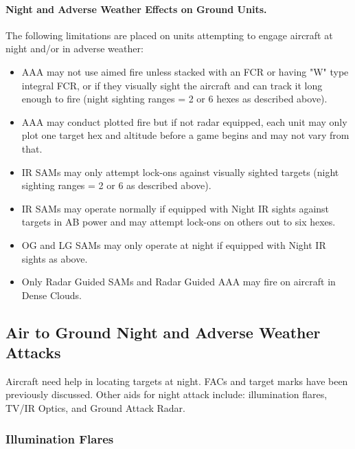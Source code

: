 \paragraph{Night and Adverse Weather Effects on Ground Units.} The following limitations are placed on units attempting to engage aircraft at night and/or in adverse weather:

\begin{itemize}

    \item AAA may not use aimed fire unless stacked with an FCR or having "W" type integral FCR, or if they visually sight the aircraft and can track it long enough to fire (night sighting ranges = 2 or 6 hexes as described above).

    \item AAA may conduct plotted fire but if not radar equipped, each unit may only plot one target hex and altitude before a game begins and may not vary from that.

    \item IR SAMs may only attempt lock-ons against visually sighted targets (night sighting ranges = 2 or 6 as described above).

    \item IR SAMs may operate normally if equipped with Night IR sights against targets in AB power and may attempt lock-ons on others out to six hexes.

    \item OG and LG SAMs may only operate at night if equipped with Night IR sights as above.

    \item Only Radar Guided SAMs and Radar Guided AAA may fire on aircraft in Dense Clouds.

\end{itemize}

\subsection{Air to Ground Night and Adverse Weather Attacks}

Aircraft need help in locating targets at night. FACs and target marks have been previously discussed. Other aids for night attack include: illumination flares, TV/IR Optics, and Ground Attack Radar.

\subsubsection{Illumination Flares}

